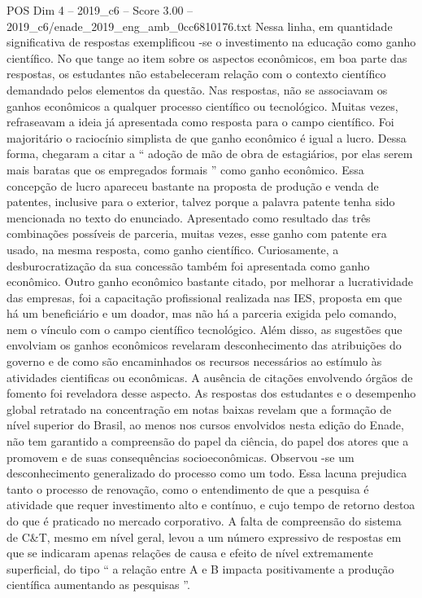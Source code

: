 \begin{textsample}{POS Dim 4 – 2019\_c6 – Score 3.00 – 2019\_c6/enade\_2019\_eng\_amb\_0cc6810176.txt}
Nessa linha, em quantidade significativa de respostas exemplificou -se o investimento na educação como ganho científico.
No que tange ao item sobre os aspectos econômicos, em boa parte das respostas, os estudantes não estabeleceram relação com o contexto científico demandado pelos elementos da questão.
Nas respostas, não se associavam os ganhos econômicos a qualquer processo científico ou tecnológico.
Muitas vezes, refraseavam a ideia já apresentada como resposta para o campo científico.
Foi majoritário o raciocínio simplista de que ganho econômico é igual a lucro.
Dessa forma, chegaram a citar a “ adoção de mão de obra de estagiários, por elas serem mais baratas que os empregados formais ” como ganho econômico.
Essa concepção de lucro apareceu bastante na proposta de produção e venda de patentes, inclusive para o exterior, talvez porque a palavra patente tenha sido mencionada no texto do enunciado.
Apresentado como resultado das três combinações possíveis de parceria, muitas vezes, esse ganho com patente era usado, na mesma resposta, como ganho científico.
Curiosamente, a desburocratização da sua concessão também foi apresentada como ganho econômico.
Outro ganho econômico bastante citado, por melhorar a lucratividade das empresas, foi a capacitação profissional realizada nas IES, proposta em que há um beneficiário e um doador, mas não há a parceria exigida pelo comando, nem o vínculo com o campo científico tecnológico.
Além disso, as sugestões que envolviam os ganhos econômicos revelaram desconhecimento das atribuições do governo e de como são encaminhados os recursos necessários ao estímulo às atividades cientificas ou econômicas.
A ausência de citações envolvendo órgãos de fomento foi reveladora desse aspecto.
As respostas dos estudantes e o desempenho global retratado na concentração em notas baixas revelam que a formação de nível superior do Brasil, ao menos nos cursos envolvidos nesta edição do Enade, não tem garantido a compreensão do papel da ciência, do papel dos atores que a promovem e de suas consequências socioeconômicas.
Observou -se um desconhecimento generalizado do processo como um todo.
Essa lacuna prejudica tanto o processo de renovação, como o entendimento de que a pesquisa é atividade que requer investimento alto e contínuo, e cujo tempo de retorno destoa do que é praticado no mercado corporativo.
A falta de compreensão do sistema de C\&T, mesmo em nível geral, levou a um número expressivo de respostas em que se indicaram apenas relações de causa e efeito de nível extremamente superficial, do tipo “ a relação entre A e B impacta positivamente a produção científica aumentando as pesquisas ”.

\end{textsample}
